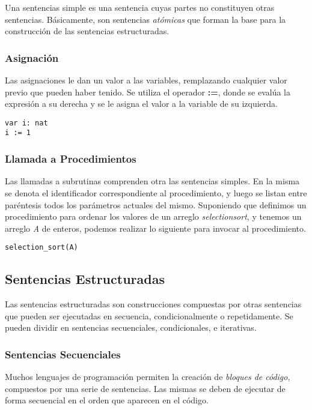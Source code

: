 \documentclass{article}
\begin{document}
Una sentencias simple es una sentencia cuyas partes no constituyen otras sentencias.
Básicamente, son sentencias \textit{atómicas} que forman la base para la construcción de las sentencias estructuradas.

\subsubsection{Asignación}

Las asignaciones le dan un valor a las variables, remplazando cualquier valor previo que pueden haber tenido.
Se utiliza el operador \textbf{:=}, donde se evalúa la expresión a su derecha y se le asigna el valor a la variable de su izquierda.

\begin{lstlisting}
var i: nat
i := 1
\end{lstlisting}

\subsubsection{Llamada a Procedimientos}

Las llamadas a subrutinas comprenden otra las sentencias simples.
En la misma se denota el identificador correspondiente al procedimiento, y luego se listan entre paréntesis todos los parámetros actuales del mismo.
Suponiendo que definimos un procedimiento para ordenar los valores de un arreglo \textit{selection\gbajo sort}, y tenemos un arreglo \textit{A} de enteros, podemos realizar lo siguiente para invocar al procedimiento.

\begin{lstlisting}
selection_sort(A)
\end{lstlisting}

\subsection{Sentencias Estructuradas}

Las sentencias estructuradas son construcciones compuestas por otras sentencias que pueden ser ejecutadas en secuencia, condicionalmente o repetidamente.
Se pueden dividir en sentencias secuenciales, condicionales, e iterativas.

\subsubsection{Sentencias Secuenciales}

Muchos lenguajes de programación permiten la creación de \textit{bloques de código}, compuestos por una serie de sentencias.
Las mismas se deben de ejecutar de forma secuencial en el orden que aparecen en el código.
\end{document}
